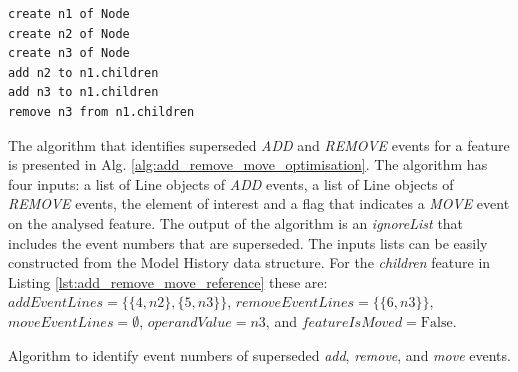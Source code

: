 \documentclass[12pt, a4paper]{report} \usepackage[titletoc]{appendix}
\begin{document}
\begin{lstlisting}[style=eol,caption={Example of CBP representation of attribute \emph{values}'s add and remove operations.},label=lst:add_remove_move_reference]
create n1 of Node
create n2 of Node
create n3 of Node
add n2 to n1.children
add n3 to n1.children
remove n3 from n1.children
\end{lstlisting}

The algorithm that identifies superseded \emph{ADD} and \emph{REMOVE} events for a feature is presented in Alg. \ref{alg:add_remove_move_optimisation}. The algorithm has four inputs: a list of Line objects of \emph{ADD} events, a list of Line objects of \emph{REMOVE} events, the element of interest and a flag that indicates a \emph{MOVE} event on the analysed feature.  The output of the algorithm is an \emph{ignoreList} that includes the event numbers that are superseded. The inputs lists can be easily constructed from the Model History data structure. For the \emph{children} feature in Listing \ref{lst:add_remove_move_reference} these are: $addEventLines=\{\{4,n2\},\{5,n3\}\}$, $removeEventLines=\{\{6,n3\}\}$, $moveEventLines=\emptyset$, $operandValue=n3$, and $featureIsMoved=\mathrm{False}$.

\begin{algorithm}[H]
	\begin{small}
	\end{small}
	\caption{Algorithm to identify event numbers of superseded \emph{add}, \emph{remove}, and \emph{move} events.}
	\label{alg:add_remove_move_optimisation}
\end{algorithm}
\end{document}
